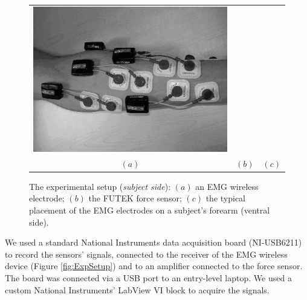 \begin{figure}[!t]
\begin{tabular}{ccc}
    \includegraphics[height=0.16\textheight]{figs/El_Arrangement} \\
    $(a)$ & $(b)$ & $(c)$ \\
  \end{tabular}
  \caption{The experimental setup (\textit{subject side}): $(a)$ an EMG
    wireless electrode; $(b)$ the FUTEK force sensor; $(c)$ the typical
    placement of the EMG electrodes on a subject's forearm (ventral side).}
  \label{fig:SubjSetup}
\end{figure}

We used a standard National Instruments data acquisition board
(NI-USB6211) to record the sensors' signals, connected to the receiver
of the EMG wireless device (Figure \ref{fig:ExpSetup}) and to an
amplifier connected to the force sensor. The board was connected via a
USB port to an entry-level laptop. We used a custom National
Instruments' LabView VI block to acquire the signals.

